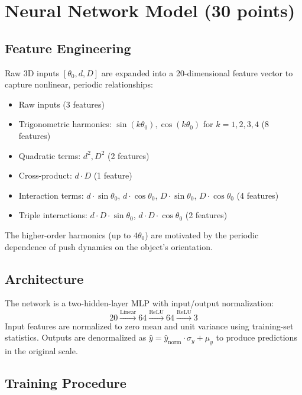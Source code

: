 \documentclass[a4paper]{article}
\begin{document}
\section{Neural Network Model (30 points)}

\subsection{Feature Engineering}

Raw 3D inputs $[\theta_0, d, D]$ are expanded into a 20-dimensional feature vector to capture nonlinear, periodic relationships:

\begin{itemize}
    \item Raw inputs (3 features)
    \item Trigonometric harmonics: $\sin(k\theta_0), \cos(k\theta_0)$ for $k = 1, 2, 3, 4$ (8 features)
    \item Quadratic terms: $d^2, D^2$ (2 features)
    \item Cross-product: $d \cdot D$ (1 feature)
    \item Interaction terms: $d \cdot \sin\theta_0$, $d \cdot \cos\theta_0$, $D \cdot \sin\theta_0$, $D \cdot \cos\theta_0$ (4 features)
    \item Triple interactions: $d \cdot D \cdot \sin\theta_0$, $d \cdot D \cdot \cos\theta_0$ (2 features)
\end{itemize}

The higher-order harmonics (up to $4\theta_0$) are motivated by the periodic dependence of push dynamics on the object's orientation.

\subsection{Architecture}

The network is a two-hidden-layer MLP with input/output normalization:
\[
    20 \xrightarrow{\text{Linear}} 64 \xrightarrow{\text{ReLU}} 64 \xrightarrow{\text{ReLU}} 3
\]
Input features are normalized to zero mean and unit variance using training-set statistics. Outputs are denormalized as $\hat{y} = \hat{y}_{\text{norm}} \cdot \sigma_y + \mu_y$ to produce predictions in the original scale.

\subsection{Training Procedure}
\end{document}

